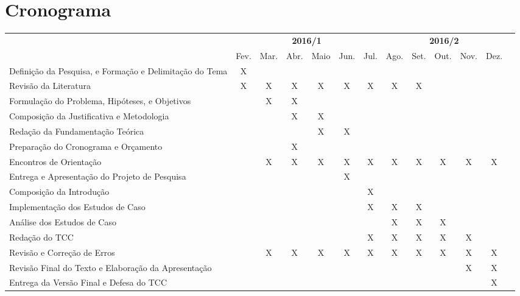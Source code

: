 \section{Cronograma}\label{lcronograma}

\begin{adjustbox}{center}
  \tiny
  \begin{tabular}{|p{4cm}|c|c|c|c|c|c|c|c|c|c|c|l|}
    \cline{1-12}
      \multicolumn{1}{|c|}{
        \multirow{2}{*}{
          \diagbox[width=4.4cm]{
            \textbf{Atividades}
          }{
            \textbf{Ano/Mês}
          }}}
      & \multicolumn{6}{c|}{\textbf{2016/1}}
      & \multicolumn{5}{c|}{\textbf{2016/2}} \\
      \cline{2-12}
      & Fev. & Mar. & Abr. & Maio & Jun. & Jul. & Ago. & Set. & Out. & Nov. & Dez. \\
    \hline
      Definição da Pesquisa, e Formação e Delimitação do Tema
      & X &  &  &  &  &  &  &  &  &  &  \\
    \hline
      Revisão da Literatura
      & X & X & X & X & X & X & X & X &  &  &  \\
    \hline
      Formulação do Problema, Hipóteses, e Objetivos
      & & X & X & &  &  &  &  &  &  &  \\
    \hline
      Composição da Justificativa e Metodologia
      & & & X & X & & & & & & & \\
    \hline
      Redação da Fundamentação Teórica
      & & & & X & X & & & & & & \\
    \hline
      Preparação do Cronograma e Orçamento
      & & & X & & & & & & & & \\
    \hline
      Encontros de Orientação
      & & X & X & X & X & X & X & X & X & X & X \\
    \hline
      Entrega e Apresentação do Projeto de Pesquisa
      & & & & & X & & & & & & \\
    \hline
      Composição da Introdução
      & & & & & & X & & & & & \\
    \hline
      Implementação dos Estudos de Caso
      & & & & & & X & X & X & & & \\
    \hline
      Análise dos Estudos de Caso
      & & & & & & & X & X & X & & \\
    \hline
      Redação do TCC
      & & & & & & X & X & X & X & X & \\
    \hline
      Revisão e Correção de Erros
      & & X & X & X & X & X & X & X & X & X & X \\
    \hline
      Revisão Final do Texto e Elaboração da Apresentação
      & & & & & & & & & & X & X \\
    \hline
      Entrega da Versão Final e Defesa do TCC
      & & & & & & & & & & & X \\
    \hline
  \end{tabular}
\end{adjustbox}
